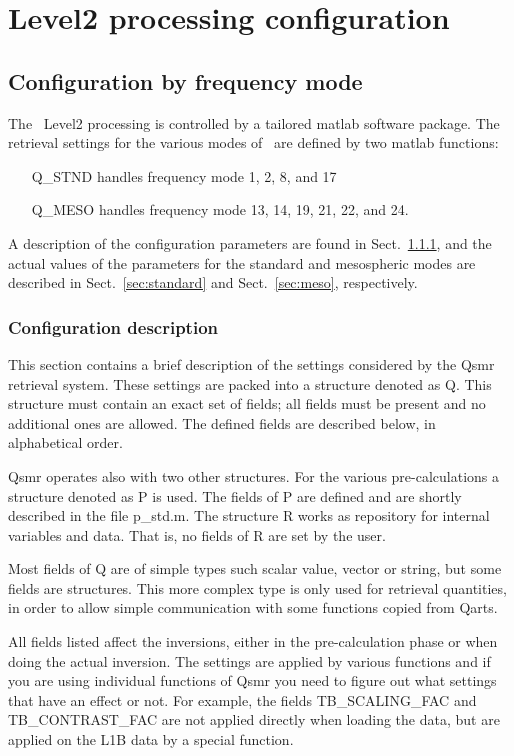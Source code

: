 \chapter{Level2 processing configuration}

\section{Configuration by frequency mode}
The \smr\ Level2 processing is controlled by a tailored matlab software
package. The retrieval settings for the various modes of \smr\
are defined by two matlab functions:
 
\begin{itemize}
\item[{Q\_STND}]
  handles frequency mode 1, 2, 8, and 17
\item[{Q\_MESO}]
  handles frequency mode 13, 14, 19, 21, 22, and 24.
\end{itemize}

A description of the configuration parameters are found
in Sect.~\ref{sec:config}, and the actual values
of the parameters for the standard and mesospheric modes
are described in Sect.~\ref{sec:standard} and Sect.~\ref{sec:meso},
respectively.

\subsection{Configuration description}
\label{sec:config}

This section contains a brief description of the settings considered by the
Qsmr retrieval system. These settings are packed into a structure denoted
as Q. This structure must contain an exact set of fields; all fields must be
present and no additional ones are allowed. The defined fields are described
below, in alphabetical order.

Qsmr operates also with two other structures. For the various
pre-calculations a structure denoted as P is used. The fields of P are
defined and are shortly described in the file p\_std.m. The structure R works
as repository for internal variables and data. That is, no fields of R are
set by the user.

Most fields of Q are of simple types such scalar value, vector or string,
but some fields are structures. This more complex type is only used for
retrieval quantities, in order to allow simple communication with some
functions copied from Qarts.

All fields listed affect the inversions, either in the pre-calculation phase
or when doing the actual inversion. The settings are applied by various
functions and if you are using individual functions of Qsmr you need to
figure out what settings that have an effect or not. For example, the fields
TB\_SCALING\_FAC and TB\_CONTRAST\_FAC are not applied directly when loading the
data, but are applied on the L1B data by a special function.

